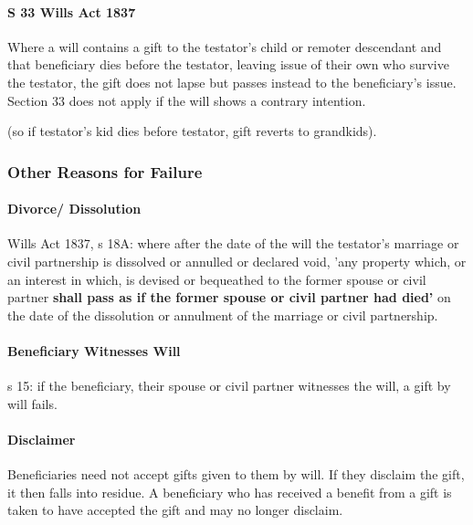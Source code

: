 \documentclass[
]{article}
\begin{document}
\hypertarget{s-33-wills-act-1837}{%
\paragraph{S 33 Wills Act 1837}\label{s-33-wills-act-1837}}

Where a will contains a gift to the testator's child or remoter
descendant and that beneficiary dies before the testator, leaving issue
of their own who survive the testator, the gift does not lapse but
passes instead to the beneficiary's issue. Section 33 does not apply if
the will shows a contrary intention.

(so if testator's kid dies before testator, gift reverts to grandkids).

\hypertarget{other-reasons-for-failure}{%
\subsubsection{Other Reasons for
Failure}\label{other-reasons-for-failure}}

\hypertarget{divorce-dissolution}{%
\paragraph{Divorce/ Dissolution}\label{divorce-dissolution}}

Wills Act 1837, s 18A: where after the date of the will the testator's
marriage or civil partnership is dissolved or annulled or declared void,
'any property which, or an interest in which, is devised or bequeathed
to the former spouse or civil partner \textbf{shall pass as if the
former spouse or civil partner had died'} on the date of the dissolution
or annulment of the marriage or civil partnership.

\hypertarget{beneficiary-witnesses-will}{%
\paragraph{Beneficiary Witnesses
Will}\label{beneficiary-witnesses-will}}

s 15: if the beneficiary, their spouse or civil partner witnesses the
will, a gift by will fails.

\hypertarget{disclaimer}{%
\paragraph{Disclaimer}\label{disclaimer}}

Beneficiaries need not accept gifts given to them by will. If they
disclaim the gift, it then falls into residue. A beneficiary who has
received a benefit from a gift is taken to have accepted the gift and
may no longer disclaim.
\end{document}

